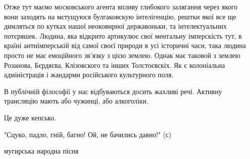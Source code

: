 Отже тут маємо московського агента впливу глибокого залягання через якого вони
заходять на мєтущуюся булгаковскую інтелігенцію, рештки якої все ще димляться
по кутках нашої неоковирної державоньки, та інтелектуальних потєряшек. Людина,
яка відкрито артикулює свої ментальну імперскість тут, в країні антиімперській
від самої своєї природи в усі історичні часи, така людина просто не має
емоційного зв'язку з цією землею. Однак має таковой з землею Розанова,
Бєрдяєва, Клізовского та інших Толстоєвскіх. Як є колоніальна адміністрація і
жандарми російського культурного поля.

В публічній філософії у нас відбуваються досить жахливі речі. Активну
трансляцію мають або чужинці, або алкоголіки.

Це дуже кепсько.

"Сцуко, падло, гній, багно! Ой, не бачились давно!" (с)

мугирська народна пісня

